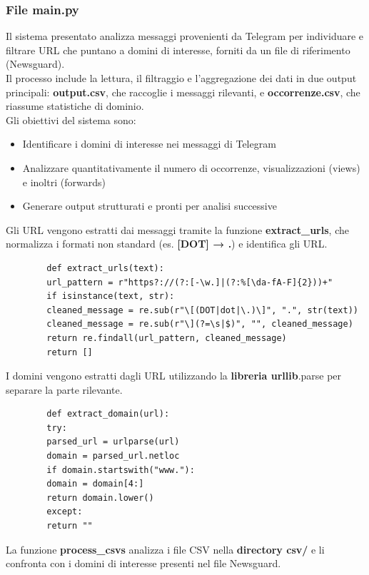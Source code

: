 \documentclass[12pt]{article}
\begin{document}
	\subsubsection{File main.py}
	Il sistema presentato analizza messaggi provenienti da Telegram per individuare e filtrare URL che puntano a domini di interesse, forniti da un file di riferimento (Newsguard).\\
	Il processo include la lettura, il filtraggio e l'aggregazione dei dati in due output principali: \textbf{output.csv}, che raccoglie i messaggi rilevanti, e \textbf{occorrenze.csv}, che riassume statistiche di dominio.\\
	Gli obiettivi del sistema sono:
	\begin{itemize}[label=]
		\item Identificare i domini di interesse nei messaggi di Telegram
		\item Analizzare quantitativamente il numero di occorrenze, visualizzazioni (views) e inoltri (forwards)
		\item Generare output strutturati e pronti per analisi successive
	\end{itemize}
	Gli URL vengono estratti dai messaggi tramite la funzione \textbf{extract\_urls}, che normalizza i formati non standard (es. \textbf{[DOT] → .}) e identifica gli URL.
	\begin{lstlisting}
		def extract_urls(text):
		url_pattern = r"https?://(?:[-\w.]|(?:%[\da-fA-F]{2}))+"
		if isinstance(text, str):
		cleaned_message = re.sub(r"\[(DOT|dot|\.)\]", ".", str(text))
		cleaned_message = re.sub(r"\](?=\s|$)", "", cleaned_message)
		return re.findall(url_pattern, cleaned_message)
		return []
	\end{lstlisting}
	I domini vengono estratti dagli URL utilizzando la \textbf{libreria urllib}.parse per separare la parte rilevante.
	\begin{lstlisting}
		def extract_domain(url):
		try:
		parsed_url = urlparse(url)
		domain = parsed_url.netloc
		if domain.startswith("www."):
		domain = domain[4:]
		return domain.lower()
		except:
		return ""
	\end{lstlisting}
	La funzione\textbf{ process\_csvs} analizza i file CSV nella \textbf{directory csv/} e li confronta con i domini di interesse presenti nel file Newsguard.
\end{document}
